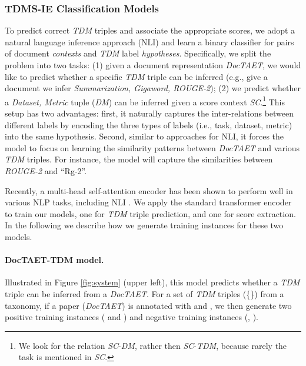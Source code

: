 \documentclass[11pt,a4paper]{article}
\begin{document}
\subsubsection{TDMS-IE Classification Models}
\label{sec:tdms-ie-train}
To predict correct \emph{TDM} triples and associate the appropriate scores, we adopt a natural language inference approach (NLI) \cite{poliak:etal:18} and learn a binary classifier for pairs of document \emph{contexts} and \emph{TDM} label \emph{hypotheses}.
Specifically, we split the problem into two tasks:  (1) given a document representation \emph{DocTAET}, we would like to predict whether a specific \emph{TDM} triple can be inferred (e.g., give a document we infer \emph{Summarization, Gigaword, ROUGE-2}); 
(2) we predict whether a \emph{Dataset, Metric} tuple (\emph{DM}) can be inferred given a score context \emph{SC}.\footnote{We look for the relation \emph{SC}-\emph{DM}, rather then \emph{SC}-\emph{TDM}, because rarely the task is mentioned in \emph{SC}.}
This setup has two advantages: first, it naturally captures the inter-relations between different labels by encoding the three types of labels (i.e., task, dataset, metric) into the same hypothesis. 
Second, similar to approaches for NLI, it forces the model to focus on learning the similarity patterns between \emph{DocTAET} and various \emph{TDM} triples. For instance, the model will capture the similarities between \emph{ROUGE-2} and ``Rg-2''.

Recently, a multi-head self-attention encoder \cite{ashish17} has been shown to perform well in various NLP tasks, including NLI \cite{BERT}. 
We apply the standard transformer encoder \cite{BERT} to train our models, one for \emph{TDM} triple prediction, and one for score extraction. In the following we describe how we generate training instances for these two models.

\paragraph{DocTAET-TDM model.} Illustrated in Figure \ref{fig:system} (upper left), this model predicts whether a \emph{TDM} triple can be inferred from a \emph{DocTAET}. For a set of  \emph{TDM} triples (\{\}) from a taxonomy, if a paper  (\emph{DocTAET}) is annotated with  and , we then generate two positive training instances ( and ) and  negative training instances (, ).
\end{document}
